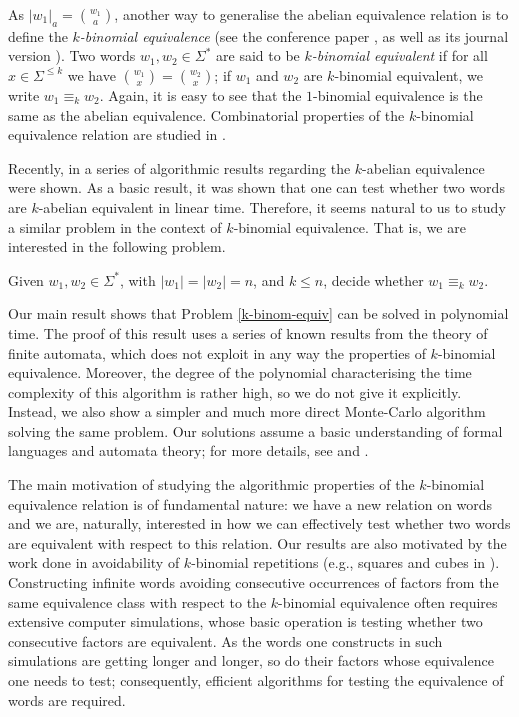 \documentclass[runningheads]{llncs}
\begin{document}
As $|w_1|_a={w_1\choose a}$, another way to generalise the abelian equivalence relation is to define the \emph{$k$-binomial equivalence} (see the conference paper \cite{RigoWORDS}, as well as its journal version \cite{rigo1}). Two words $w_1,w_2\in \Sigma^*$ are said to be \emph{$k$-binomial equivalent} if for all $x\in \Sigma^{\leq k}$ we have ${w_1 \choose x}={w_2\choose x}$; if $w_1$ and $w_2$ are $k$-binomial equivalent, we write $w_1\equiv_k w_2$. Again, it is easy to see that the $1$-binomial equivalence is the same as the abelian equivalence. Combinatorial properties of the $k$-binomial equivalence relation are studied in \cite{RigoWORDS,rigo1,rigo2}. 

Recently, in \cite{EhMaMeNo14,EMMN15} a series of algorithmic results regarding the $k$-abelian equivalence were shown. As a basic result, it was shown that one can test whether two words are $k$-abelian equivalent in linear time. Therefore, it seems natural to us to study a similar problem in the context of $k$-binomial equivalence. That is, we are interested in the following problem.

\begin{problem}\label{k-binom-equiv}
Given $w_1,w_2\in \Sigma^*$, with $|w_1|=|w_2|=n$, and $k\leq n$, decide whether $w_1\equiv_k w_2$.
\end{problem}

Our main result shows that Problem \ref{k-binom-equiv} can be solved in polynomial time. The proof of this result uses a series of known results from the theory of finite automata, which does not exploit in any way the properties of $k$-binomial equivalence. Moreover, the degree of the polynomial characterising the time complexity of this algorithm is rather high, so we do not give it explicitly. Instead, we also show a simpler and much more direct Monte-Carlo algorithm solving the same problem. Our solutions assume a basic understanding of formal languages and automata theory; for more details, see \cite{roz:han} and \cite{Sak09}.

The main motivation of studying the algorithmic properties of the $k$-binomial equivalence relation is of fundamental nature: we have a new relation on words and we are, naturally, interested in how we can effectively test whether two words are equivalent with respect to this relation. Our results are also motivated by the work done in avoidability of $k$-binomial repetitions (e.g., squares and cubes in \cite{rigo2}). Constructing infinite words avoiding consecutive occurrences of factors from the same equivalence class with respect to the $k$-binomial equivalence often requires extensive computer simulations, whose basic operation is testing whether two consecutive factors are equivalent. As the words one constructs in such simulations are getting longer and longer, so do their factors whose equivalence one needs to test; consequently, efficient algorithms for testing the equivalence of words are required.
\end{document}
